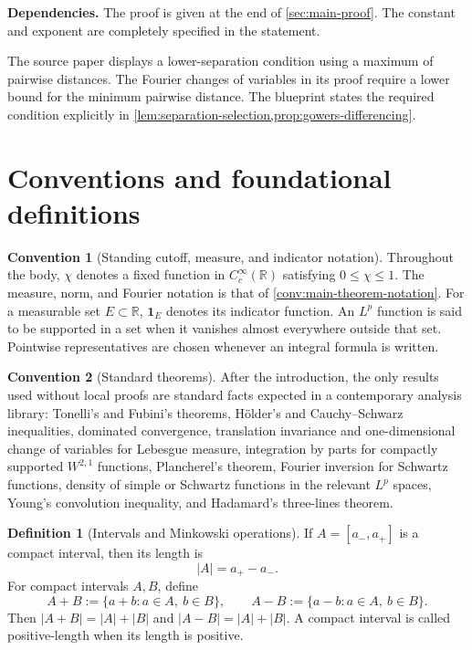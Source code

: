 \documentclass[11pt]{article}
\theoremstyle{definition}
\newtheorem{definition}[definition]{Definition}
\newtheorem{convention}[convention]{Convention}
\theoremstyle{remark}
\newcommand{\R}{\mathbb R}
\newcommand{\1}{\mathbf 1}
\newcommand{\uses}[1]{\par\smallskip\noindent\textbf{Dependencies.} #1\par\smallskip}
\begin{document}
\uses{The proof is given at the end of \cref{sec:main-proof}.  The constant and exponent are completely specified in the statement.}

The source paper displays a lower-separation condition using a maximum of pairwise distances.  The Fourier changes of variables in its proof require a lower bound for the minimum pairwise distance.  The blueprint states the required condition explicitly in \cref{lem:separation-selection,prop:gowers-differencing}.

\section{Conventions and foundational definitions}

\begin{convention}[Standing cutoff, measure, and indicator notation]\label{conv:standing-cutoff}
Throughout the body, $\chi$ denotes a fixed function in $C_c^\infty(\R)$ satisfying
$0\leq\chi\leq1$.  The measure, norm, and Fourier notation is that of 
\cref{conv:main-theorem-notation}.  For a measurable set $E\subset\R$, $\1_E$ denotes its indicator function.  An $L^p$ function is said to be supported in a set when it vanishes almost everywhere outside that set.  Pointwise representatives are chosen whenever an integral formula is written.
\end{convention}

\begin{convention}[Standard theorems]\label{conv:standard-theorems}
After the introduction, the only results used without local proofs are standard facts expected in a contemporary analysis library: Tonelli's and Fubini's theorems, H\"older's and Cauchy--Schwarz inequalities, dominated convergence, translation invariance and one-dimensional change of variables for Lebesgue measure, integration by parts for compactly supported $W^{2,1}$ functions, Plancherel's theorem, Fourier inversion for Schwartz functions, density of simple or Schwartz functions in the relevant $L^p$ spaces, Young's convolution inequality, and Hadamard's three-lines theorem.
\end{convention}

\begin{definition}[Intervals and Minkowski operations]\label{def:intervals}
If $A=[a_-,a_+]$ is a compact interval, then its length is
\[
\lvert A\rvert=a_+-a_-.
\]
For compact intervals $A,B$, define
\[
A+B:=\{a+b:a\in A,\ b\in B\},
\qquad
A-B:=\{a-b:a\in A,\ b\in B\}.
\]
Then $\lvert A+B\rvert=\lvert A\rvert+\lvert B\rvert$ and $\lvert A-B\rvert=\lvert A\rvert+\lvert B\rvert$.
A compact interval is called positive-length when its length is positive.
\end{definition}
\end{document}
